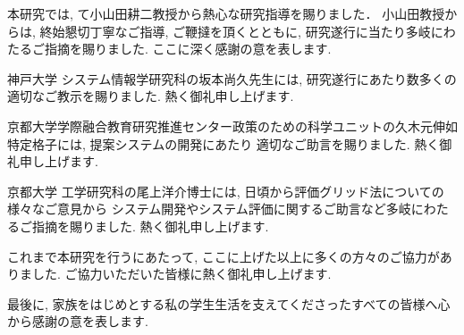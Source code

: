 \documentclass[syuuron]{kuee}
\begin{document}
\begin{acknowledgements}
	本研究では, て小山田耕二教授から熱心な研究指導を賜りました．
	小山田教授からは, 終始懇切丁寧なご指導, ご鞭撻を頂くとともに, 研究遂行に当たり多岐にわたるご指摘を賜りました. 
	ここに深く感謝の意を表します. 
	
	神戸大学 システム情報学研究科の坂本尚久先生には, 研究遂行にあたり数多くの適切なご教示を賜りました. 熱く御礼申し上げます. 
	
	京都大学学際融合教育研究推進センター政策のための科学ユニットの久木元伸如特定格子には, 提案システムの開発にあたり
	適切なご助言を賜りました. 熱く御礼申し上げます. 
	
	京都大学 工学研究科の尾上洋介博士には, 日頃から評価グリッド法についての様々なご意見から
	システム開発やシステム評価に関するご助言など多岐にわたるご指摘を賜りました. 熱く御礼申し上げます. 
	
	これまで本研究を行うにあたって, ここに上げた以上に多くの方々のご協力がありました. 
	ご協力いただいた皆様に熱く御礼申し上げます. 
	
	最後に, 家族をはじめとする私の学生生活を支えてくださったすべての皆様へ心から感謝の意を表します. 
	
\end{acknowledgements}
\end{document}
